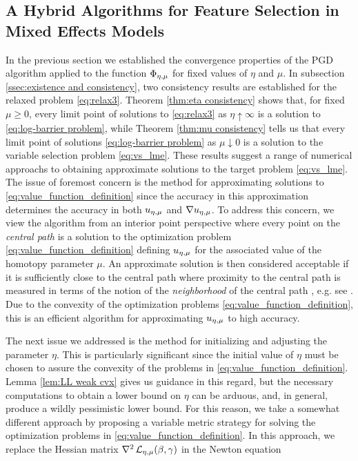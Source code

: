 \subsection{A Hybrid Algorithms for Feature Selection in Mixed Effects Models}
\label{sec:hybrid alg}

 In the previous section we established the convergence properties of the 
 PGD algorithm applied to the function $\Phi_{\eta,\mu}$ for fixed values of
 $\eta$ and $\mu$. In subsection \ref{ssec:existence and consistency},
 two consistency results are established for the relaxed problem \eqref{eq:relax3}.
 Theorem \ref{thm:eta consistency} shows that, for fixed $\mu\ge 0$,
 every limit point of solutions to \eqref{eq:relax3} as $\eta\uparrow\infty$
 is a solution to \eqref{eq:log-barrier problem}, while Theorem
 \ref{thm:mu consistency} tells us that every
 limit point of solutions \eqref{eq:log-barrier problem} as $\mu\downarrow 0$
 is a solution to the variable selection problem \eqref{eq:vs_lme}. 
These results suggest a range of numerical approachs to obtaining approximate 
solutions to the target problem \eqref{eq:vs_lme}.
 The issue of foremost concern is the method for approximating 
 solutions to \eqref{eq:value_function_definition} since the accuracy in this approximation
 determines the accuracy in both ${u_{\eta,\mu}}$ and $\nabla {u_{\eta,\mu}}$.
 To address this concern, we view the algorithm from an interior point
 perspective where every point on the {\it central path} is a solution
 to the optimization problem \eqref{eq:value_function_definition}
 defining ${u_{\eta,\mu}}$ for the associated value of the homotopy parameter $\mu$. 
 An approximate solution is then
 considered acceptable if it is sufficiently close to the central path where
 proximity to the central path is measured in terms of the notion of the 
 {\it neighborhood} of the central path , e.g. see \cite{Wright-IP-book}. 
 Due to the convexity of the optimization problems \eqref{eq:value_function_definition}, 
 this is an efficient algorithm for approximating 
 ${u_{\eta,\mu}}$ to high accuracy.
 
 The next issue we addressed is the method for initializing and adjusting the parameter 
 $\eta$.  This is particularly significant since the initial value of $\eta$ must be chosen
 to assure the convexity of the problems in \eqref{eq:value_function_definition}.
 Lemma \ref{lem:LL weak cvx} gives us guidance in this regard, but the necessary 
 computations to obtain a lower bound on $\eta$ can be arduous, and, in general,
 produce a wildly pessimistic lower bound. For this reason, we take a somewhat different 
 approach by proposing a variable metric strategy for solving the optimization problems
 in \eqref{eq:value_function_definition}. In this approach, we replace 
 the Hessian matrix $\nabla^2\operatorname{\mathcal{L}}_{{\eta,\mu}}(\beta,\gamma)$ in
 the Newton equation
 
